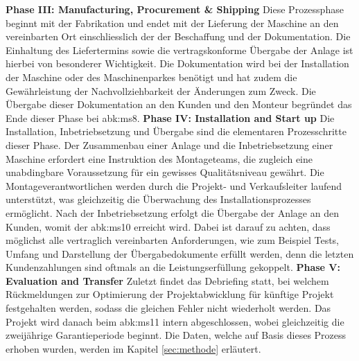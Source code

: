 \newline\newline
\textbf{Phase III: Manufacturing, Procurement \& Shipping}
\newline
Diese Prozessphase beginnt mit der Fabrikation und endet mit der Lieferung der Maschine an den vereinbarten Ort einschliesslich der der Beschaffung und der Dokumentation. Die Einhaltung des Liefertermins sowie die vertragskonforme Übergabe der Anlage ist hierbei von besonderer Wichtigkeit. Die Dokumentation wird bei der Installation der Maschine oder des Maschinenparkes benötigt und hat zudem die Gewährleistung der Nachvollziehbarkeit der Änderungen zum Zweck. Die Übergabe dieser Dokumentation an den Kunden und den Monteur begründet das Ende dieser Phase bei \gls{abk:ms8}.
\newline\newline
\textbf{Phase IV: Installation and Start up}
\newline
Die Installation, Inbetriebsetzung und Übergabe sind die elementaren Prozesschritte dieser Phase. Der Zusammenbau einer Anlage und die Inbetriebsetzung einer Maschine erfordert eine Instruktion des Montageteams, die zugleich eine unabdingbare Voraussetzung für ein gewisses Qualitätsniveau gewährt. Die Montageverantwortlichen werden durch die Projekt- und Verkaufsleiter laufend unterstützt, was gleichzeitig die Überwachung des Installationsprozesses ermöglicht. Nach der Inbetriebsetzung erfolgt die Übergabe der Anlage an den Kunden, womit der \gls{abk:ms10} erreicht wird. Dabei ist darauf zu achten, dass möglichst alle vertraglich vereinbarten Anforderungen, wie zum Beispiel Tests, Umfang und Darstellung der Übergabedokumente erfüllt werden, denn die letzten Kundenzahlungen sind oftmals an die Leistungserfüllung gekoppelt. 
\newline\newline
\textbf{Phase V: Evaluation and Transfer}
\newline
Zuletzt findet das Debriefing statt, bei welchem Rückmeldungen zur Optimierung der Projektabwicklung für künftige Projekt festgehalten werden, sodass die gleichen Fehler nicht wiederholt werden. Das Projekt wird danach beim \gls{abk:ms11} intern abgeschlossen, wobei gleichzeitig die zweijährige Garantieperiode beginnt.
\newline\newline
Die Daten, welche auf Basis dieses Prozess erhoben wurden, werden im Kapitel \ref{sec:methode} erläutert.
%
